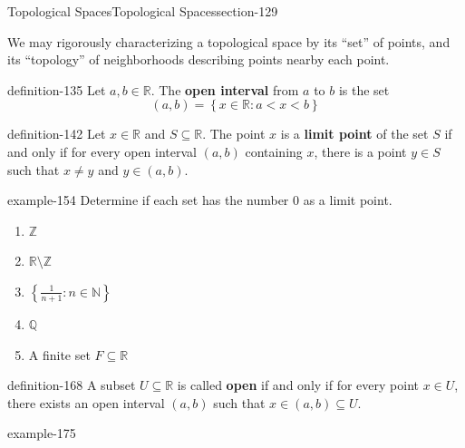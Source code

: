 \documentclass[oneside,10pt,]{article}
\newcommand{\terminology}[1]{\textbf{#1}}
\newcommand{\mb}{\mathbb}
\newcommand{\setBuilder}[2]{\left\{#1:#2\right\}}
\newcommand{\lt}{<}
\begin{document}
%
%
\typeout{************************************************}
\typeout{************************************************}
%
\begin{sectionptx}{Topological Spaces}{}{Topological Spaces}{}{}{section-129}
\begin{introduction}{}%
\hypertarget{p-132}{}%
We may rigorously characterizing a topological space by its ``set'' of points, and its ``topology'' of neighborhoods describing points nearby each point.%
\end{introduction}%
\begin{definition}{}{definition-135}%
\hypertarget{p-136}{}%
Let \(a,b\in\mb R\). The \terminology{open interval} from \(a\) to \(b\) is the set%
%
\begin{equation*}
(a,b)=\setBuilder{x\in\mb R}{a\lt x\lt b}
\end{equation*}
\end{definition}
\begin{definition}{}{definition-142}%
\hypertarget{p-143}{}%
Let \(x\in\mb R\) and \(S\subseteq\mb R\). The point \(x\) is a \terminology{limit point} of the set \(S\) if and only if for every open interval \((a,b)\) containing \(x\), there is a point \(y\in S\) such that \(x\not=y\) and \(y\in(a,b)\).%
\end{definition}
\begin{example}{}{example-154}%
\hypertarget{p-155}{}%
Determine if each set has the number \(0\) as a limit point.%
\leavevmode%
\begin{enumerate}
\item\hypertarget{li-158}{}\(\mb Z\)%
\item\hypertarget{li-160}{}\(\mb R\setminus\mb Z\)%
\item\hypertarget{li-162}{}\(\setBuilder{\frac{1}{n+1}}{n\in\mb N}\)%
\item\hypertarget{li-164}{}\(\mb Q\)%
\item\hypertarget{li-166}{}A finite set \(F\subseteq\mb R\)%
\end{enumerate}
\end{example}
\begin{definition}{}{definition-168}%
\hypertarget{p-169}{}%
A subset \(U\subseteq\mb R\) is called \terminology{open} if and only if for every point \(x\in U\), there exists an open interval \((a,b)\) such that \(x\in(a,b)\subseteq U\).%
\end{definition}
\begin{example}{}{example-175}%
\hypertarget{p-176}{}%

\end{example}
\end{sectionptx}
\end{document}
